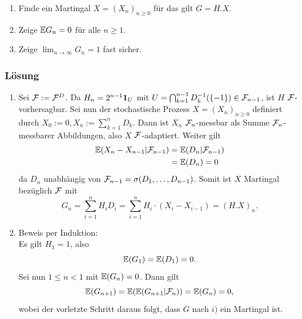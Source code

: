 \documentclass[12pt]{scrartcl}
\begin{document}
\begin{enumerate}[$i)$]
\item Finde ein Martingal $X=(X_n)_{n\ge 0}$ für das gilt $G=H.X$.
\item Zeige $\mathbb{E} G_n=0$ für alle $n\ge 1$.
\item Zeige $\lim_{n\rightarrow\infty}G_n=1$ fast sicher.
\end{enumerate}

\subsubsection*{Lösung}
\einruecken

\begin{enumerate}[$i)$,wide]
\item Sei $\mathcal{F}:=\mathcal{F}^D$. Da $H_n=2^{n-1}\textbf{1}_U$ mit $U=\bigcap_{k=1}^{n-1}D_k^{-1}(\{-1\})\in\mathcal{F}_{n-1}$, ist $H$ $\mathcal{F}$-vorhersagbar. Sei nun der stochastische Prozess $X=(X_n)_{n\ge 0}$ definiert durch $X_0:=0, X_n:=\sum_{k=1}^n D_k$. Dann ist $X_n$ $\mathcal{F}_n$-messbar als Summe $\mathcal{F}_n$-messbarer Abbildungen, also $X$ $\mathcal{F}$-adaptiert.
Weiter gilt 
\begin{align*}
	\mathbb{E}(X_n-X_{n-1}|\mathcal{F}_{n-1}) &= \mathbb{E}(D_n|\mathcal{F}_{n-1})\\
	&= \mathbb{E}(D_n) = 0
\end{align*}
da $D_n$ unabhängig von $\mathcal{F}_{n-1}=\sigma(D_1,\dots,D_{n-1})$.
Somit ist $X$ Martingal bezüglich $\mathcal{F}$ mit
$$G_n=\sum_{i=1}^n H_iD_i=\sum_{i=1}^n H_i\cdot(X_i-X_{i-1})=(H.X)_{n}.$$

\item Beweis per Induktion:\\
Es gilt $H_1=1$, also
$$\mathbb{E}(G_1)=\mathbb{E}(D_1)=0.$$
Sei nun $1\le n<1$ mit $\mathbb{E}(G_n)=0$. Dann gilt
$$\mathbb{E}(G_{n+1})=\mathbb{E}(\mathbb{E}(G_{n+1}|\mathcal{F}_{n}))=\mathbb{E}(G_n)=0,$$
wobei der vorletzte Schritt daraus folgt, dass $G$ nach $i)$ ein Martingal ist. 


\end{enumerate}
\end{document}

